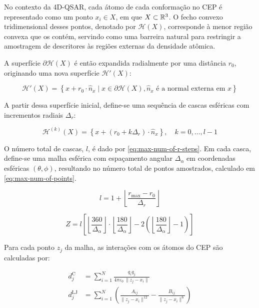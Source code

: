 No contexto da 4D-QSAR, cada átomo de cada conformação no CEP é representado como um ponto $x_i \in X$, em que $X \subset \mathbb{R}^3$. O fecho convexo tridimensional desses pontos, denotado por $\mathcal{H}(X)$, corresponde à menor região convexa que os contém, servindo como uma barreira natural para restringir a amostragem de descritores às regiões externas da densidade atômica.

A superfície $\partial \mathcal{H}(X)$ é então expandida radialmente por uma distância $r_0$, originando uma nova superfície $\mathcal{H}'(X)$:

\begin{equation}
\mathcal{H}'(X) = \left\{ x + r_0 \cdot \hat{n}_x \mid x \in \partial \mathcal{H}(X), \hat{n}_x \text{ é a normal externa em } x \right\}
\end{equation}

A partir dessa superfície inicial, define-se uma sequência de cascas esféricas com incrementos radiais $\Delta_r$:

\begin{equation}
\mathcal{H}^{(k)}(X) = \left\{ x + (r_0 + k \Delta_r) \cdot \hat{n}_x \right\}, \quad k = 0, \dots, l-1
\end{equation}

O número total de cascas, $l$, é dado por \eqref{eq:max-num-of-r-steps}. Em cada casca, define-se uma malha esférica com espaçamento angular $\Delta_\alpha$ em coordenadas esféricas $(\theta, \phi)$, resultando no número total de pontos amostrados, calculado em \eqref{eq:max-num-of-points}.

\begin{equation}
l = 1 + \left\lfloor \frac{r_{\mathrm{max}} - r_0}{\Delta_r} \right\rfloor
\label{eq:max-num-of-r-steps}
\end{equation}

\begin{equation}
Z = l \left[ \left\lfloor \frac{360}{\Delta_\alpha} \right\rfloor \cdot \left\lfloor \frac{180}{\Delta_\alpha} \right\rfloor - 2 \left( \left\lfloor \frac{180}{\Delta_\alpha} \right\rfloor - 1 \right) \right]
\label{eq:max-num-of-points}
\end{equation}

Para cada ponto $z_j$ da malha, as interações com os átomos do CEP são calculadas por:

\begin{align*}
d_j^{\text{C}} &= \sum_{i=1}^{N} \frac{q_i q_j}{4 \pi \varepsilon_0 \, \|z_j - x_i\|} \\
d_j^{\text{LJ}} &= \sum_{i=1}^{N} \left( \frac{A_{ij}}{\|z_j - x_i\|^{12}} - \frac{B_{ij}}{\|z_j - x_i\|^6} \right)
\end{align*}

